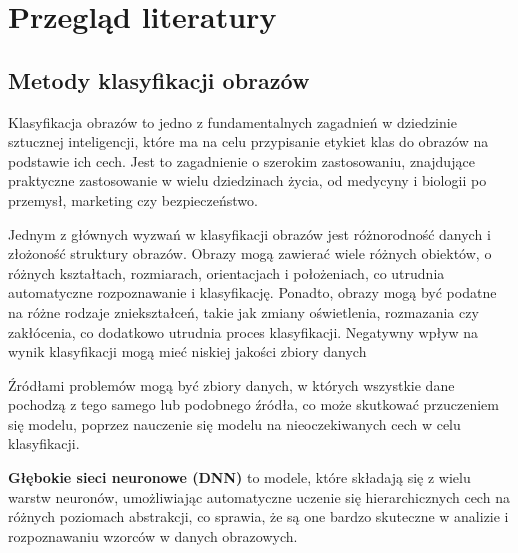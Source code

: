
\chapter*{Przegląd literatury}
\section*{Metody klasyfikacji obrazów}

Klasyfikacja obrazów to jedno z fundamentalnych zagadnień w dziedzinie sztucznej inteligencji, które ma na celu przypisanie etykiet klas do obrazów na podstawie ich cech.
Jest to zagadnienie o szerokim zastosowaniu, znajdujące praktyczne zastosowanie w wielu dziedzinach życia, od medycyny\cite{medical} i biologii\cite{biology} po przemysł, marketing\cite{marketing} czy bezpieczeństwo\cite{security}.

Jednym z głównych wyzwań w klasyfikacji obrazów\cite{imageclassificationchallanges} jest różnorodność danych i złożoność struktury obrazów.
Obrazy mogą zawierać wiele różnych obiektów, o różnych kształtach, rozmiarach, orientacjach i położeniach, co utrudnia automatyczne rozpoznawanie i klasyfikację.
Ponadto, obrazy mogą być podatne na różne rodzaje zniekształceń, takie jak zmiany oświetlenia, rozmazania czy zakłócenia, co dodatkowo utrudnia proces klasyfikacji.
Negatywny wpływ na wynik klasyfikacji mogą mieć niskiej jakości zbiory danych

Źródłami  problemów mogą być zbiory danych, w których wszystkie dane pochodzą z tego samego lub podobnego źródła, co może skutkować przuczeniem się modelu, poprzez nauczenie się modelu na nieoczekiwanych cech w celu klasyfikacji.

\textbf{Głębokie sieci neuronowe (DNN)}\cite{nature} to modele, które składają się z wielu warstw neuronów, umożliwiając automatyczne uczenie się hierarchicznych cech na różnych poziomach abstrakcji, co sprawia, że są one bardzo skuteczne w analizie i rozpoznawaniu wzorców w danych obrazowych.


